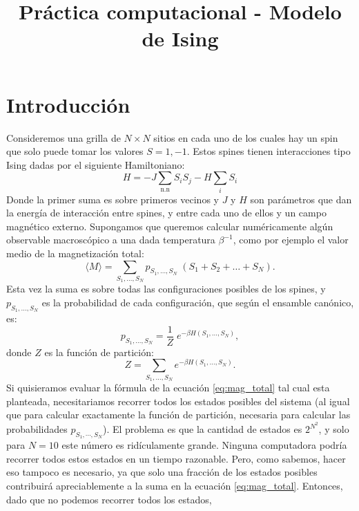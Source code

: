 \documentclass[a4paper,11pt,oneside]{article}
\title{Práctica computacional - Modelo de Ising}
\author{}
\date{}
\newcommand{\mean}[1]{\langle #1 \rangle}
\begin{document}
\maketitle

\section{Introducción}

Consideremos una grilla de $N\times N$ sitios en cada uno de los cuales hay
un spin que solo puede tomar los valores $S = 1,-1$. Estos
spines tienen interacciones tipo Ising dadas por el siguiente Hamiltoniano:
\begin{equation}
    H = -J\sum_\text{n.n} S_i S_j - H \sum_i S_i
\end{equation}
Donde la primer suma es sobre primeros vecinos y $J$ y $H$ son parámetros que
dan la energía de interacción entre spines, y entre cada uno de ellos y un
campo magnético externo. Supongamos que queremos calcular numéricamente algún
observable macroscópico a una dada temperatura $\beta^{-1}$, como por ejemplo
el valor medio de la magnetización total:
\begin{equation}
    \mean{M} = \sum_{S_1,\dots,S_N} p_{S_1,\dots,S_N} \; (S_1+S_2+\dots+S_N).
    \label{eq:mag_total}
\end{equation}
Esta vez la suma es sobre todas las configuraciones posibles de los spines, y
$p_{S_1,\dots,S_N}$ es la probabilidad de cada configuración, que según el
ensamble canónico, es:
\begin{equation}
    p_{S_1,\dots,S_N} = \frac{1}{Z} \; e^{-\beta H(S_1,\dots,S_N)},
\end{equation}
donde $Z$ es la función de partición:
\begin{equation}
    Z = \sum_{S_1,\dots,S_N} e^{-\beta H(S_1,\dots,S_N)}.
\end{equation}
Si quisieramos evaluar la fórmula de la ecuación \ref{eq:mag_total} tal cual esta planteada,
necesitariamos recorrer todos los estados posibles del sistema (al igual que
para calcular exactamente la función de partición, necesaria para calcular las
probabilidades $p_{S_1,\cdots,S_N}$). El problema es que la cantidad de estados
es $2^{N^2}$, y solo para $N=10$ este número es ridículamente grande. Ninguna
computadora podría recorrer todos estos estados en un tiempo razonable. Pero,
como sabemos, hacer eso tampoco es necesario, ya que solo una fracción de los
estados posibles contribuirá apreciablemente a la suma en la ecuación
\ref{eq:mag_total}. Entonces, dado que no podemos recorrer todos los estados,
\end{document}
